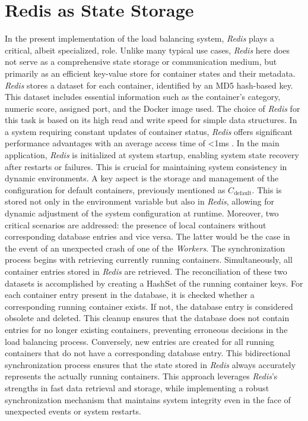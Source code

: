 \documentclass[twocolumn]{webofc}
\begin{document}
\section{Redis as State Storage}
In the present implementation of the load balancing system, \textit{Redis} plays a critical, albeit specialized, role. Unlike many typical use cases, \textit{Redis} here does not serve as a comprehensive state storage or communication medium, but primarily as an efficient key-value store for container states and their metadata. \textit{Redis} stores a dataset for each container, identified by an MD5 hash-based key. This dataset includes essential information such as the container's category, numeric score, assigned port, and the Docker image used. The choice of \textit{Redis} for this task is based on its high read and write speed for simple data structures.
In a system requiring constant updates of container status, \textit{Redis} offers significant performance advantages with an average access time of <1ms \cite{redis_docs}. In the main application, \textit{Redis} is initialized at system startup, enabling system state recovery after restarts or failures. This is crucial for maintaining system consistency in dynamic environments. A key aspect is the storage and management of the configuration for default containers, previously mentioned as \( C_{\text{default}} \). This is stored not only in the environment variable but also in \textit{Redis}, allowing for dynamic adjustment of the system configuration at runtime. Moreover, two critical scenarios are addressed: the presence of local containers without corresponding database entries and vice versa. The latter would be the case in the event of an unexpected crash of one of the \textit{Workers}. The synchronization process begins with retrieving currently running containers. Simultaneously, all container entries stored in \textit{Redis} are retrieved. The reconciliation of these two datasets is accomplished by creating a HashSet of the running container keys. For each container entry present in the database, it is checked whether a corresponding running container exists. If not, the database entry is considered obsolete and deleted. This cleanup ensures that the database does not contain entries for no longer existing containers, preventing erroneous decisions in the load balancing process. Conversely, new entries are created for all running containers that do not have a corresponding database entry. This bidirectional synchronization process ensures that the state stored in \textit{Redis} always accurately represents the actually running containers. This approach leverages \textit{Redis}'s strengths in fast data retrieval and storage, while implementing a robust synchronization mechanism that maintains system integrity even in the face of unexpected events or system restarts.
\end{document}
